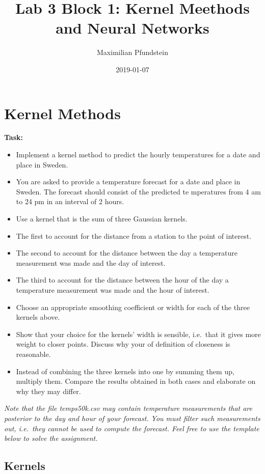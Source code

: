 \documentclass[]{article}
\title{Lab 3 Block 1: Kernel Meethods and Neural Networks}
\author{Maximilian Pfundstein}
\date{2019-01-07}
\providecommand{\tightlist}{%
  \setlength{\itemsep}{0pt}\setlength{\parskip}{0pt}}
\begin{document}
\maketitle

{
\setcounter{tocdepth}{3}
\tableofcontents
}
\section{Kernel Methods}\label{kernel-methods}

\textbf{Task:}

\begin{itemize}
\tightlist
\item
  Implement a kernel method to predict the hourly temperatures for a
  date and place in Sweden.
\item
  You are asked to provide a temperature forecast for a date and place
  in Sweden. The forecast should consist of the predicted te mperatures
  from 4 am to 24 pm in an interval of 2 hours.
\item
  Use a kernel that is the sum of three Gaussian kernels.
\item
  The first to account for the distance from a station to the point of
  interest.
\item
  The second to account for the distance between the day a temperature
  measurement was made and the day of interest.
\item
  The third to account for the distance between the hour of the day a
  temperature measurement was made and the hour of interest.
\item
  Choose an appropriate smoothing coefficient or width for each of the
  three kernels above.
\item
  Show that your choice for the kernels' width is sensible, i.e.~that it
  gives more weight to closer points. Discuss why your of definition of
  closeness is reasonable.
\item
  Instead of combining the three kernels into one by summing them up,
  multiply them. Compare the results obtained in both cases and
  elaborate on why they may differ.
\end{itemize}

\emph{Note that the file temps50k.csv may contain temperature
measurements that are posterior to the day and hour of your forecast.
You must filter such measurements out, i.e.~they cannot be used to
compute the forecast. Feel free to use the template below to solve the
assignment.}

\subsection{Kernels}\label{kernels}
\end{document}
